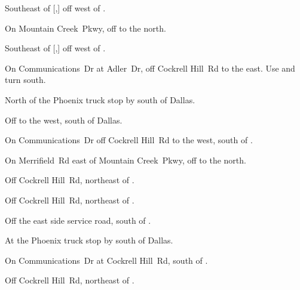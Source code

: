 
\begin{LocationList}

Southeast of [,] off  west of  .

On Mountain Creek~Pkwy, off   to the north.

Southeast of [,] off  west of  .

On Communications~Dr at Adler~Dr, off Cockrell Hill~Rd to the east.
Use   and turn south.

\Location{\GarageHQ \Garage}
North of the Phoenix truck stop by   south of Dallas.

Off   to the west, south of Dallas.

On Communications~Dr off Cockrell Hill~Rd to the west, south of  .

On Merrifield~Rd east of Mountain Creek~Pkwy, off   to the north.

Off Cockrell Hill~Rd, northeast of  .

\Location{\RecruitmentAgency \Recruitment}
Off Cockrell Hill~Rd, northeast of  .

Off the east side  service road, south of .

At the Phoenix truck stop by   south of Dallas.

On Communications~Dr at Cockrell Hill~Rd, south of  .

Off Cockrell Hill~Rd, northeast of  .

\end{LocationList}
